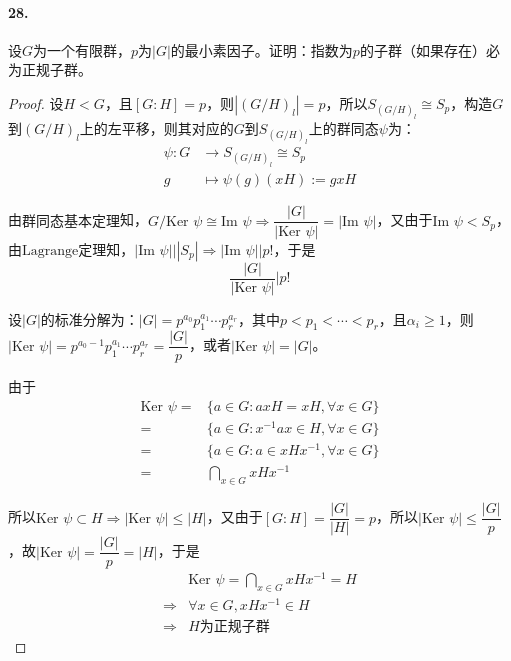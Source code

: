 \documentclass[12pt, a4paper, oneside]{ctexart}
\begin{document}
\paragraph{28.}设$G$为一个有限群，$p$为$|G|$的最小素因子。证明：指数为$p$的子群（如果存在）必为正规子群。
\begin{proof}
    设$H < G$，且$[G:H] = p$，则$|(G/H)_l| = p$，所以$S_{(G/H)_l}\cong S_p$，构造$G$到$(G/H)_l$上的左平移，则其对应的$G$到$S_{(G/H)_l}$上的群同态$\psi$为：
    \begin{equation*}
        \begin{aligned}
            \psi:G&\rightarrow S_{(G/H)_l}\cong S_p\\
            g&\mapsto \psi(g)(xH):= gxH
        \end{aligned}
    \end{equation*}

    由$\text{群同态基本定理}$知，$G/\text{Ker }\psi \cong \text{Im }\psi\Rightarrow \dfrac{|G|}{|\text{Ker }\psi|}=|\text{Im }\psi|$，又由于$\text{Im }\psi< S_p$，由$\text{Lagrange定理}$知，$|\text{Im }\psi|\biggl||S_p|\Rightarrow |\text{Im }\psi|\biggl|p!$，于是
    \begin{equation*}
        \frac{|G|}{|\text{Ker }\psi|} \biggl | p!
    \end{equation*}
    
    设$|G|$的标准分解为：$|G| = p^{a_0}p_1^{a_1}\cdots p_r^{a_r}$，其中$p<p_1<\cdots<p_r$，且$\alpha_i\geqslant 1$，则$|\text{Ker }\psi|=p^{a_0-1}p_1^{a_1}\cdots p_r^{a_r}=\dfrac{|G|}{p}$，或者$|\text{Ker }\psi|=|G|$。

    由于
    \begin{equation*}
        \begin{aligned}
        \text{Ker }\psi =& \{a\in G:axH = xH,\forall x\in G\} \\
        =& \{a\in G:x^{-1}ax\in H,\forall x\in G\}\\
        =& \{a\in G:a \in xHx^{-1},\forall x\in G\} \\
        =& \bigcap_{x\in G}xHx^{-1}
        \end{aligned}
    \end{equation*}

    所以$\text{Ker }\psi\subset H\Rightarrow |\text{Ker }\psi| \leqslant |H|$，又由于$[G:H]=\dfrac{|G|}{|H|} = p$，所以$|\text{Ker }\psi|\leqslant \dfrac{|G|}{p}$，故$|\text{Ker }\psi| = \dfrac{|G|}{p} = |H|$，于是
    \begin{equation*}
        \begin{aligned}
            &\text{Ker }\psi = \bigcap_{x\in G}xHx^{-1} = H\\
            \Rightarrow &\forall x\in G,xHx^{-1}\in H\\
            \Rightarrow &H\text{为正规子群}
        \end{aligned}
    \end{equation*}
\end{proof}
\end{document}
